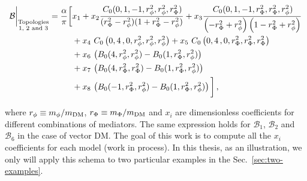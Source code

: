 \begin{align}
{\cal B}\bigg|_{\substack{\text{Topologies}\\\text{1, 2 and 3}}}= \dfrac{\alpha}{\pi}\bigg[%
&x_1 
+x_2 \dfrac{ \, C_0( 0, 1, -1, \rmed ^2, \rmed ^2, \rDMp^2)  }{(\rDMp^2-\rmed^2)(1+\rDMp^2-\rmed^2)}
+x_3 \dfrac{ \, C_0( 0, 1, -1, \rDMp^2, \rDMp^2, \rmed ^2)}{\left(-\rDMp^2+\rmed^2\right)\left(1-\rDMp^2+\rmed^2\right)}\nonumber\\
&+x_4 \,\, C_0\left( 0, 4 \, , 0, \rmed ^2, \rmed ^2, \rmed ^2\right)
+ x_5 \,\,  C_0\left( 0, 4 \, , 0, \rDMp^2,\rDMp^2, \rDMp^2 \right)\nonumber\\
&+x_6\, \left(B_0(4 , \rmed^2 ,\rmed^2 )- B_0(1 ,\rDMp^2, \rmed^2 )\right)\nonumber\\
&+x_7\, \left(B_0(4 , \rDMp^2,\rDMp^2)- B_0(1 ,\rDMp^2, \rmed^2 )\right)\nonumber\\
&+x_8\, \left(B_0(-1 , \rDMp^2,\rmed^2 )- B_0( 1,\rDMp^2, \rmed^2 )\right)%
\bigg]\,,%
\label{eq:B123expansion}
\end{align}

\begin{comment}
\begin{align}
{\cal B}_\text{T123}= \dfrac{\alpha}{\pi}\bigg[%
&x_1 
+x_2 \dfrac{ \mDM^2\, C_0( 0, \mDM^2, -\mDM^2, \mmed^2, \mmed^2, \mDMp^2)  }{(\rDMp^2-\rmed^2)(1+\rDMp^2-\rmed^2)}
+x_3 \dfrac{ \mDM^2\, C_0( 0, \mDM^2, -\mDM^2, \mDMp^2, \mDMp^2, \mmed^2)}{\left(-\rDMp^2+\rmed^2\right)\left(1-\rDMp^2+\rmed^2\right)}\nonumber\\
&+x_4 \,\mDM^2\, C_0\left( 0, 4 \, \mDM^2, 0, \mmed^2, \mmed^2, \mmed^2\right)
+ x_5 \,\mDM^2\,  C_0\left( 0, 4 \, \mDM^2, 0, \mDMp^2,\mDMp^2, \mDMp^2 \right)\nonumber\\
&+x_6\, \left(B_0(4 \mDM^2, \mmed,\mmed)- B_0( \mDM^2,\mDMp, \mmed)\right)\nonumber\\
&+x_7\, \left(B_0(4 \mDM^2, \mDMp,\mDMp)- B_0( \mDM^2,\mDMp, \mmed)\right)\nonumber\\
&+x_8\, \left(B_0(- \mDM^2, \mDMp,\mmed)- B_0( \mDM^2,\mDMp, \mmed)\right)%
\bigg]\,,%
\label{eq:B123expansion}
\end{align}
\end{comment}
%
where $r_\phi \equiv m_\phi/m_{\text{DM}}$, $r_{\Phi} \equiv m_{\Phi}/m_{\text{DM}}$  and $x_i$ are dimensionless coefficients for different combinations of mediators. The same expression holds for $\mathcal{B}_1$, $\mathcal{B}_2$ and $\mathcal{B}_6$ in the case of vector DM.
The goal of this work is to compute all the $x_i$ coefficients for each model (work in process). In this thesis, as an illustration, we only will apply this schema to two particular examples in the Sec.~\ref{sec:two-examples}.











